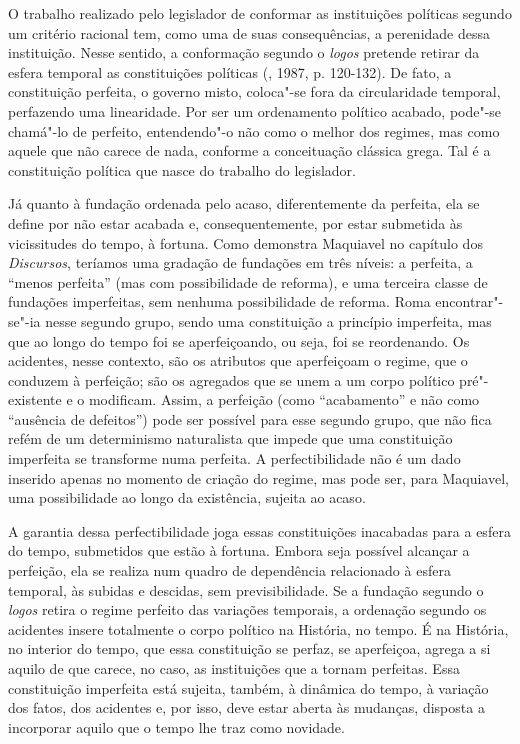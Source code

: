 O trabalho realizado pelo legislador de conformar as instituições
políticas segundo um critério racional tem, como uma de suas
consequências, a perenidade dessa instituição. Nesse sentido, a
conformação segundo o \emph{logos} pretende retirar da esfera temporal
as constituições políticas (, 1987, p. 120-132). De fato, a
constituição perfeita, o governo misto, coloca"-se fora da circularidade
temporal, perfazendo uma linearidade. Por ser um ordenamento político
acabado, pode"-se chamá"-lo de perfeito, entendendo"-o não como o melhor
dos regimes, mas como aquele que não carece de nada, conforme a
conceituação clássica grega. Tal é a constituição política que nasce do
trabalho do legislador.

Já quanto à fundação ordenada pelo acaso, diferentemente da perfeita,
ela se define por não estar acabada e, consequentemente, por estar
submetida às vicissitudes do tempo, à fortuna. Como demonstra Maquiavel
no capítulo  dos \emph{Discursos}, teríamos uma gradação de fundações
em três níveis: a perfeita, a ``menos perfeita'' (mas com possibilidade
de reforma), e uma terceira classe de fundações imperfeitas, sem nenhuma
possibilidade de reforma. Roma encontrar"-se"-ia nesse segundo grupo,
sendo uma constituição a princípio imperfeita, mas que ao longo do tempo
foi se aperfeiçoando, ou seja, foi se reordenando. Os acidentes, nesse
contexto, são os atributos que aperfeiçoam o regime, que o conduzem à
perfeição; são os agregados que se unem a um corpo político
pré"-existente e o modificam. Assim, a perfeição (como ``acabamento'' e
não como ``ausência de defeitos'') pode ser possível para esse segundo
grupo, que não fica refém de um determinismo naturalista que impede que
uma constituição imperfeita se transforme numa perfeita. A
perfectibilidade não é um dado inserido apenas no momento de criação do
regime, mas pode ser, para Maquiavel, uma possibilidade ao longo da
existência, sujeita ao acaso.

A garantia dessa perfectibilidade joga essas constituições inacabadas
para a esfera do tempo, submetidos que estão à fortuna. Embora seja
possível alcançar a perfeição, ela se realiza num quadro de dependência
relacionado à esfera temporal, às subidas e descidas, sem
previsibilidade. Se a fundação segundo o \emph{logos} retira o regime
perfeito das variações temporais, a ordenação segundo os acidentes
insere totalmente o corpo político na História, no tempo. É na História,
no interior do tempo, que essa constituição se perfaz, se aperfeiçoa,
agrega a si aquilo de que carece, no caso, as instituições que a tornam
perfeitas. Essa constituição imperfeita está sujeita, também, à dinâmica
do tempo, à variação dos fatos, dos acidentes e, por isso, deve estar
aberta às mudanças, disposta a incorporar aquilo que o tempo lhe traz
como novidade.

